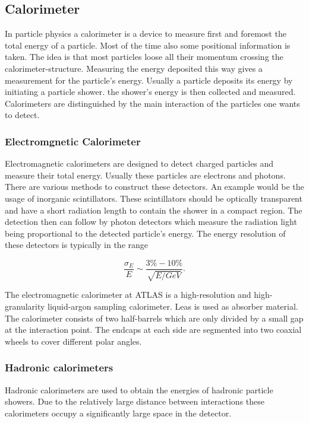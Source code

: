 \subsection{Calorimeter}

In particle physics a calorimeter is a device to measure first and foremost the total energy of a particle. Most of the time also some positional information is taken.
The idea is that most particles loose all their momentum crossing the calorimeter-structure. Measuring the energy deposited this way gives a measurement for the particle's energy.
Usually a particle deposits its energy by initiating a particle shower. the shower's energy is then collected and measured.
Calorimeters are distinguished by the main interaction of the particles one wants to detect. 
\subsubsection{Electromgnetic Calorimeter}

Electromagnetic calorimeters are designed to detect charged particles and measure their total energy. Usually these particles are electrons and photons. There are various methods to construct these detectors. An example would be the usage of inorganic scintillators. These scintillators should be optically transparent and have a short radiation length to contain the shower in a compact region. The detection then can follow by photon detectors which measure the radiation light being proportional to the detected particle's energy. The energy resolution of these detectors is typically in the range

\begin{equation}
\frac{\sigma_E}{E} \sim \frac{3 \% - 10 \%}{\sqrt{E/GeV}}.
\end{equation}

The electromagnetic calorimeter at ATLAS is a high-resolution and high-granularity liquid-argon sampling calorimeter. Leas is used as absorber material. The calorimeter consists of two half-barrels which are only divided by a small gap at the interaction point. The endcaps at each side are segmented into two coaxial wheels to cover different polar angles.

\subsubsection{Hadronic calorimeters}

Hadronic calorimeters are used to obtain the energies of hadronic particle showers.
Due to the relatively large distance between interactions these calorimeters occupy a significantly large space in the detector.

